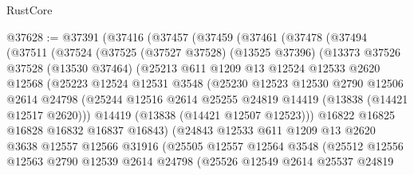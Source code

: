 \begin{lexlean}{RustCore}
\begin{coremodule}
@37628 := @37391
    (@37416
      (@37457
        (@37459
          (@37461
            (@37478
              (@37494
                (@37511
                  (@37524
                    (@37525
                      (@37527 @37528)
                      (@13525 @37396)
                      (@13373
                        @37526
                        @37528
                        (@13530 @37464)
                        (@25213
                          @611
                          @1209
                          @13
                          @12524
                          @12533
                          @2620
                          @12568
                          (@25223
                            @12524
                            @12531
                            @3548
                            (@25230
                              @12523
                              @12530
                              @2790
                              @12506
                              @2614
                              @24798
                              (@25244
                                @12516
                                @2614
                                @25255
                                @24819
                                @14419
                                (@13838 (@14421 @12517 @2620)))
                              @14419
                              (@13838 (@14421 @12507 @12523)))
                            @16822
                            @16825
                            @16828
                            @16832
                            @16837
                            @16843)
                          (@24843
                            @12533
                            @611
                            @1209
                            @13
                            @2620
                            @3638
                            @12557
                            @12566
                            @31916
                            (@25505
                              @12557
                              @12564
                              @3548
                              (@25512
                                @12556
                                @12563
                                @2790
                                @12539
                                @2614
                                @24798
                                (@25526
                                  @12549
                                  @2614
                                  @25537
                                  @24819

\end{coremodule}
\end{lexlean}
